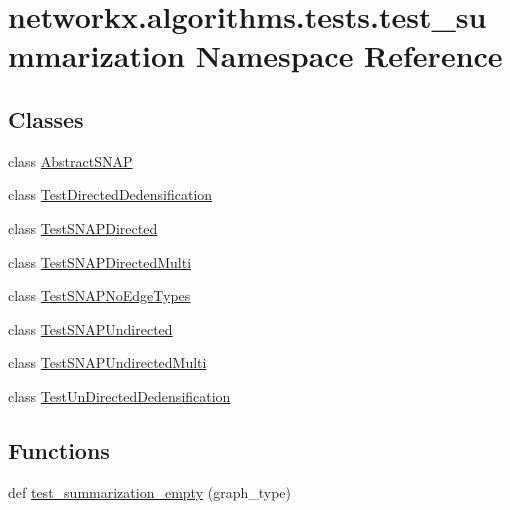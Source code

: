 \hypertarget{namespacenetworkx_1_1algorithms_1_1tests_1_1test__summarization}{}\section{networkx.\+algorithms.\+tests.\+test\+\_\+summarization Namespace Reference}
\label{namespacenetworkx_1_1algorithms_1_1tests_1_1test__summarization}
\subsection*{Classes}
\begin{DoxyCompactItemize}
\item 
class \hyperlink{classnetworkx_1_1algorithms_1_1tests_1_1test__summarization_1_1AbstractSNAP}{Abstract\+S\+N\+AP}
\item 
class \hyperlink{classnetworkx_1_1algorithms_1_1tests_1_1test__summarization_1_1TestDirectedDedensification}{Test\+Directed\+Dedensification}
\item 
class \hyperlink{classnetworkx_1_1algorithms_1_1tests_1_1test__summarization_1_1TestSNAPDirected}{Test\+S\+N\+A\+P\+Directed}
\item 
class \hyperlink{classnetworkx_1_1algorithms_1_1tests_1_1test__summarization_1_1TestSNAPDirectedMulti}{Test\+S\+N\+A\+P\+Directed\+Multi}
\item 
class \hyperlink{classnetworkx_1_1algorithms_1_1tests_1_1test__summarization_1_1TestSNAPNoEdgeTypes}{Test\+S\+N\+A\+P\+No\+Edge\+Types}
\item 
class \hyperlink{classnetworkx_1_1algorithms_1_1tests_1_1test__summarization_1_1TestSNAPUndirected}{Test\+S\+N\+A\+P\+Undirected}
\item 
class \hyperlink{classnetworkx_1_1algorithms_1_1tests_1_1test__summarization_1_1TestSNAPUndirectedMulti}{Test\+S\+N\+A\+P\+Undirected\+Multi}
\item 
class \hyperlink{classnetworkx_1_1algorithms_1_1tests_1_1test__summarization_1_1TestUnDirectedDedensification}{Test\+Un\+Directed\+Dedensification}
\end{DoxyCompactItemize}
\subsection*{Functions}
\begin{DoxyCompactItemize}
\item 
def \hyperlink{namespacenetworkx_1_1algorithms_1_1tests_1_1test__summarization_a8a4fc139fed260183a58f4223c1ba924}{test\+\_\+summarization\+\_\+empty} (graph\+\_\+type)
\end{DoxyCompactItemize}


